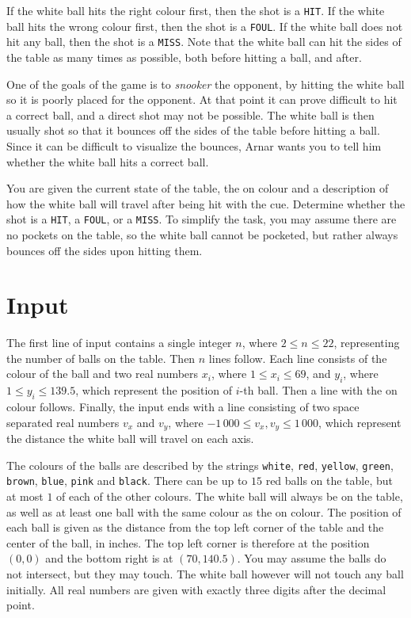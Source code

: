 If the white ball hits the right colour first, then the shot is a \texttt{HIT}.
If the white ball hits the wrong colour first, then the shot is a \texttt{FOUL}.
If the white ball does not hit any ball, then the shot is a \texttt{MISS}.
Note that the white ball can hit the sides of the table as many times as possible, both before hitting a ball, and after.

One of the goals of the game is to \emph{snooker} the opponent, by hitting the white ball so it is poorly placed for the opponent.
At that point it can prove difficult to hit a correct ball, and a direct shot may not be possible.
The white ball is then usually shot so that it bounces off the sides of the table before hitting a ball.
Since it can be difficult to visualize the bounces, Arnar wants you to tell him whether the white ball hits a correct ball.

You are given the current state of the table, the on colour and a description of how the white ball will travel after being hit with the cue.
Determine whether the shot is a \texttt{HIT}, a \texttt{FOUL}, or a \texttt{MISS}.
To simplify the task, you may assume there are no pockets on the table, so the white ball cannot be pocketed, but rather always bounces off the sides upon hitting them.

\section*{Input}
The first line of input contains a single integer $n$, where $2 \leq n \leq 22$, representing the number of balls on the table.
Then $n$ lines follow.
Each line consists of the colour of the ball and two real numbers $x_i$, where $1 \leq x_i \leq 69$, and $y_i$, where $1 \leq y_i \leq 139.5$,
which represent the position of $i$-th ball.
Then a line with the on colour follows.
Finally, the input ends with a line consisting of two space separated real numbers $v_x$ and $v_y$, where $-1\,000 \leq v_x, v_y \leq 1\,000$, which represent the distance the white ball will travel on each axis.

The colours of the balls are described by the strings \texttt{white}, \texttt{red}, \texttt{yellow}, \texttt{green}, \texttt{brown}, \texttt{blue}, \texttt{pink} and \texttt{black}.
There can be up to $15$ red balls on the table, but at most $1$ of each of the other colours.
The white ball will always be on the table, as well as at least one ball with the same colour as the on colour.
The position of each ball is given as the distance from the top left corner of the table and the center of the ball, in inches.
The top left corner is therefore at the position $(0, 0)$ and the bottom right is at $(70, 140.5)$.
You may assume the balls do not intersect, but they may touch.
The white ball however will not touch any ball initially.
All real numbers are given with exactly three digits after the decimal point.

